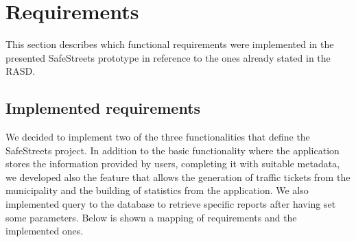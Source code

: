 \documentclass[../ITD.tex]{subfiles}
\begin{document}
    \chapter{Requirements}\label{ch:requirements}
    This section describes which functional requirements were implemented in the presented SafeStreets prototype in reference to the ones already stated in the RASD.
    \section{Implemented requirements}\label{sec:implemented-requirements}
    We decided to implement two of the three functionalities that define the SafeStreets project.
    In addition to the basic functionality where the application stores the information provided by users,
    completing it with suitable metadata, we developed also the feature that allows the generation of traffic
    tickets from the municipality and the building of statistics from the application.
    We also implemented query to the database to retrieve specific reports after having set some parameters.
    \newline Below is shown a mapping of requirements and the implemented ones.
\end{document}
